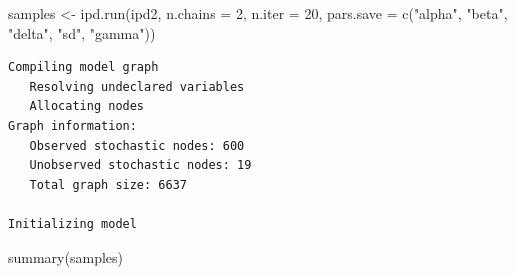 \documentclass[
  letterpaper,
  DIV=11,
  numbers=noendperiod]{scrreprt}
\newenvironment{Shaded}{\begin{snugshade}}{\end{snugshade}}
\newcommand{\AttributeTok}[1]{\textcolor[rgb]{0.40,0.45,0.13}{#1}}
\newcommand{\DecValTok}[1]{\textcolor[rgb]{0.68,0.00,0.00}{#1}}
\newcommand{\FunctionTok}[1]{\textcolor[rgb]{0.28,0.35,0.67}{#1}}
\newcommand{\NormalTok}[1]{\textcolor[rgb]{0.00,0.23,0.31}{#1}}
\newcommand{\OtherTok}[1]{\textcolor[rgb]{0.00,0.23,0.31}{#1}}
\newcommand{\StringTok}[1]{\textcolor[rgb]{0.13,0.47,0.30}{#1}}
\begin{document}
\begin{Shaded}
\begin{Highlighting}[]
\NormalTok{samples }\OtherTok{\textless{}{-}} \FunctionTok{ipd.run}\NormalTok{(ipd2, }\AttributeTok{n.chains =} \DecValTok{2}\NormalTok{, }\AttributeTok{n.iter =} \DecValTok{20}\NormalTok{, }
                   \AttributeTok{pars.save =} \FunctionTok{c}\NormalTok{(}\StringTok{"alpha"}\NormalTok{, }\StringTok{"beta"}\NormalTok{, }\StringTok{"delta"}\NormalTok{, }\StringTok{"sd"}\NormalTok{, }\StringTok{"gamma"}\NormalTok{))}
\end{Highlighting}
\end{Shaded}

\begin{verbatim}
Compiling model graph
   Resolving undeclared variables
   Allocating nodes
Graph information:
   Observed stochastic nodes: 600
   Unobserved stochastic nodes: 19
   Total graph size: 6637

Initializing model
\end{verbatim}

\begin{Shaded}
\begin{Highlighting}[]
\FunctionTok{summary}\NormalTok{(samples)}
\end{Highlighting}
\end{Shaded}
\end{document}

